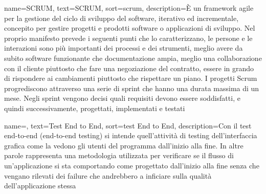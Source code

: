 {
	name={SCRUM},
	text=SCRUM,
	sort=scrum,
	description={È un framework agile per la gestione del ciclo di sviluppo del software, iterativo ed incrementale, concepito per gestire progetti e prodotti software o applicazioni di sviluppo. Nel proprio manifesto prevede i seguenti punti che lo caratterizzano, le persone e le interazioni sono più importanti dei processi e dei strumenti, meglio avere da subito software funzionante che documentazione ampia, meglio una collaborazione con il cliente piuttosto che fare una negoziazione del contratto, essere in grando di rispondere ai cambiamenti piuttosto che rispettare un piano. 
	I progetti Scrum progrediscono attraverso una serie di sprint che hanno una durata massima di un mese. Negli sprint vengono decisi quali requisiti devono essere soddisfatti, e quindi successivamente, progettati, implementati e testati}
}

{
	name=,
	text=Test End to End,
	sort=test End to End,
	description={Con il test end-to-end (end-to-end testing) si intende quell’attività di testing dell’interfaccia grafica come la vedono gli utenti del programma dall’inizio alla fine. In altre parole rappresenta una metodologia utilizzata per verificare se il flusso di un’applicazione si sta comportando come progettato dall’inizio alla fine senza che vengano rilevati dei failure che andrebbero a inficiare sulla qualità dell’applicazione stessa}
}
